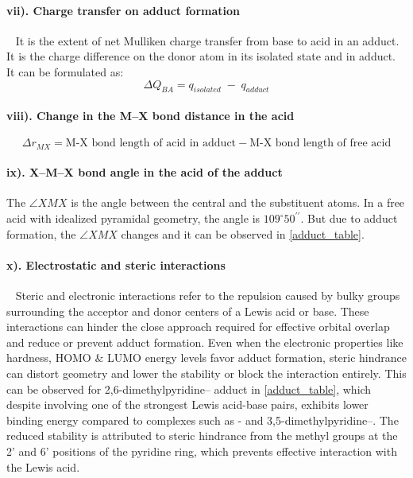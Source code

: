 \paragraph{vii). Charge transfer on adduct formation}~
It is the extent of net Mulliken charge transfer from base to acid in an adduct. It is the charge difference on the donor atom in its isolated state and in adduct. It can be formulated as:
\[
\Delta Q_{BA} = q_{isolated} \;-\; q_{adduct}
\]


\paragraph{viii). Change in the M–X bond distance in the acid}
\[
\Delta r_{MX} = \text{M-X bond length  of acid in adduct} - \text{M-X bond length  of free acid}
\]

\paragraph{ix). X–M–X bond angle in the acid of the adduct}
The \( \angle XMX\)  is the angle between the central and the substituent atoms. In a free acid with idealized pyramidal geometry, the angle is \( 109^\circ 50^{\prime\prime}\). But due to adduct formation, the \( \angle XMX\) changes and it can be observed in \cref{adduct_table}.


\paragraph{x). Electrostatic and steric interactions}~
Steric and electronic interactions refer to the repulsion caused by bulky groups surrounding the acceptor and donor centers of a Lewis acid or base. These interactions can hinder the close approach required for effective orbital overlap and reduce or prevent adduct formation. Even when the electronic properties like hardness, HOMO $\&$ LUMO energy levels favor adduct formation, steric hindrance can distort geometry and lower the stability or block the interaction entirely. This can be observed for 2,6-dimethylpyridine– adduct in \cref{adduct_table}, which despite involving one of the strongest Lewis acid-base pairs, exhibits lower binding energy compared to complexes such as - and 3,5-dimethylpyridine–. The reduced stability is attributed to steric hindrance from the methyl groups at the 2' and 6' positions of the pyridine ring, which prevents effective interaction with the Lewis acid.
\vspace{1em}

